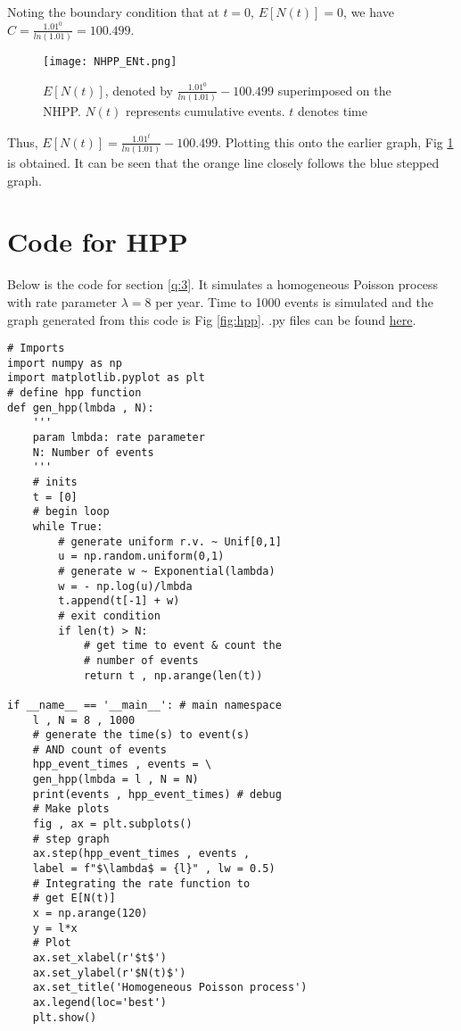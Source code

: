 \documentclass[%
 reprint,
 amsmath,amssymb,
 aps,
]{revtex4-2}
\theoremstyle{definition}
\begin{document}
Noting the boundary condition that at $t=0$, $E[N(t)]=0$, we have $C = \frac{1.01^0}{ln(1.01)} = 100.499$.\\

\begin{figure}[H]
\centering
\texttt{[image: NHPP\_ENt.png]}
\caption{\label{fig:nhppent}$E[N(t)]$, denoted by $\frac{1.01^0}{ln(1.01)} - 100.499$ superimposed on the NHPP. $N(t)$ represents cumulative events. $t$ denotes time}
\end{figure}

Thus,  $E[N(t)] = \frac{1.01^t}{ln(1.01)} - 100.499$. Plotting this onto the earlier graph, Fig \ref{fig:nhppent} is obtained. It can be seen that the orange line closely follows the blue stepped graph.

\appendix

\section{\label{app:hppcode}Code for HPP}
Below is the code for section \ref{q:3}. It simulates a homogeneous Poisson process with rate parameter $\lambda=8$ per year. Time to 1000 events is simulated and the graph generated from this code is Fig \ref{fig:hpp}. .py files can be found \href{https://github.com/sourasen1011/Stochastic_Processes/blob/main/CA3/project_helper/HPP.py}{here}.
\begin{verbatim}
# Imports
import numpy as np
import matplotlib.pyplot as plt
# define hpp function
def gen_hpp(lmbda , N):
    '''
    param lmbda: rate parameter
    N: Number of events
    '''
    # inits
    t = [0]
    # begin loop
    while True:
        # generate uniform r.v. ~ Unif[0,1]
        u = np.random.uniform(0,1)
        # generate w ~ Exponential(lambda)
        w = - np.log(u)/lmbda
        t.append(t[-1] + w)
        # exit condition
        if len(t) > N:
            # get time to event & count the
            # number of events
            return t , np.arange(len(t))

if __name__ == '__main__': # main namespace
    l , N = 8 , 1000
    # generate the time(s) to event(s)
    # AND count of events
    hpp_event_times , events = \
    gen_hpp(lmbda = l , N = N)
    print(events , hpp_event_times) # debug
    # Make plots
    fig , ax = plt.subplots()
    # step graph
    ax.step(hpp_event_times , events ,
    label = f"$\lambda$ = {l}" , lw = 0.5)
    # Integrating the rate function to 
    # get E[N(t)]
    x = np.arange(120)
    y = l*x
    # Plot
    ax.set_xlabel(r'$t$')
    ax.set_ylabel(r'$N(t)$')
    ax.set_title('Homogeneous Poisson process')
    ax.legend(loc='best')
    plt.show()
\end{verbatim}
\end{document}
